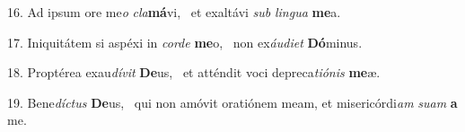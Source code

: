 16. Ad ipsum ore me\textit{o} \textit{cla}\textbf{má}vi, \ast\  et exaltávi \textit{sub} \textit{lin}\textit{gua} \textbf{me}a.\

17. Iniquitátem si aspéxi in \textit{cor}\textit{de} \textbf{me}o, \ast\  non ex\textit{áu}\textit{di}\textit{et} \textbf{Dó}minus.\

18. Proptérea exau\textit{dí}\textit{vit} \textbf{De}us, \ast\  et atténdit voci depreca\textit{ti}\textit{ó}\textit{nis} \textbf{me}æ.\

19. Bene\textit{díc}\textit{tus} \textbf{De}us, \ast\  qui non amóvit oratiónem meam, et misericórdi\textit{am} \textit{su}\textit{am} \textbf{a} me.\

